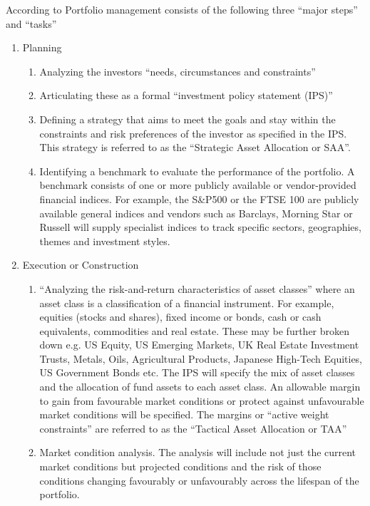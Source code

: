 \documentclass[oneside,12pt]{Classes/RoboticsLaTeX}
\begin{document}
According to \citet{BakerH.Kent2013PTaM} Portfolio management consists of the following three “major steps” and “tasks”
\begin{enumerate}
\item Planning \citep[p.2]{BakerH.Kent2013PTaM}
    \begin{enumerate}
    \item Analyzing the investors “needs, circumstances and constraints”
    \item Articulating these as a formal “investment policy statement (IPS)”
    \item Defining a strategy that aims to meet the goals and stay within the constraints and risk preferences of the investor as specified in the IPS. This strategy is referred to as the “Strategic Asset Allocation or SAA”. 
    \item Identifying a benchmark to evaluate the performance of the portfolio. A benchmark consists of one or more publicly available or vendor-provided financial indices.  For example, the S\&P500 or the FTSE 100 are publicly available general indices and vendors such as Barclays, Morning Star or Russell will supply specialist indices to track specific sectors, geographies, themes and investment styles.
    \end{enumerate}
\item Execution or Construction \citep[p.2-3]{BakerH.Kent2013PTaM}
    \begin{enumerate}
    \item “Analyzing the risk-and-return characteristics of asset classes” where an asset class is a classification of a financial instrument.  For example, equities (stocks and shares), fixed income or bonds, cash or cash equivalents, commodities and real estate. These may be further broken down e.g. US Equity, US Emerging Markets, UK Real Estate Investment Trusts, Metals, Oils, Agricultural Products, Japanese High-Tech Equities, US Government Bonds etc.  The IPS will specify the mix of asset classes and the allocation of fund assets to each asset class. An allowable margin to gain from favourable market conditions or protect against unfavourable market conditions will be specified. The margins or “active weight constraints” are referred to as the “Tactical Asset Allocation or TAA”
    \item Market condition analysis. The analysis will include not just the current market conditions but projected conditions and the risk of those conditions changing favourably or unfavourably across the lifespan of the portfolio. 

\end{enumerate}
\end{enumerate}
\end{document}
